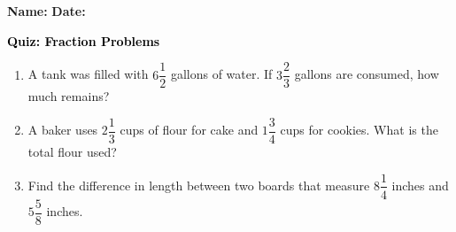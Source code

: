 \documentclass[12pt, letterpaper, fleqn]{article}
\begin{document}
\textbf{Name:} \underline{\hspace{5cm}}
\hfill
\textbf{Date:} \underline{\hspace{3cm}}\\

\begin{tcolorbox}[colback=customteal!20]
    \large\textcolor{black}{\textbf{Quiz: Fraction Problems}}
\end{tcolorbox}
\begin{enumerate}[itemsep=3.5cm, leftmargin=0.6cm]
\item A tank was filled with $6\dfrac{1}{2}$ gallons of water. If $3\dfrac{2}{3}$ gallons are consumed, how much remains?
\vspace{3.5cm}
\item A baker uses $2\dfrac{1}{3}$ cups of flour for cake and $1\dfrac{3}{4}$ cups for cookies. What is the total flour used?
\vspace{3.5cm}
\item Find the difference in length between two boards that measure $8\dfrac{1}{4}$ inches and $5\dfrac{5}{8}$ inches.
\end{enumerate}
\end{document}
